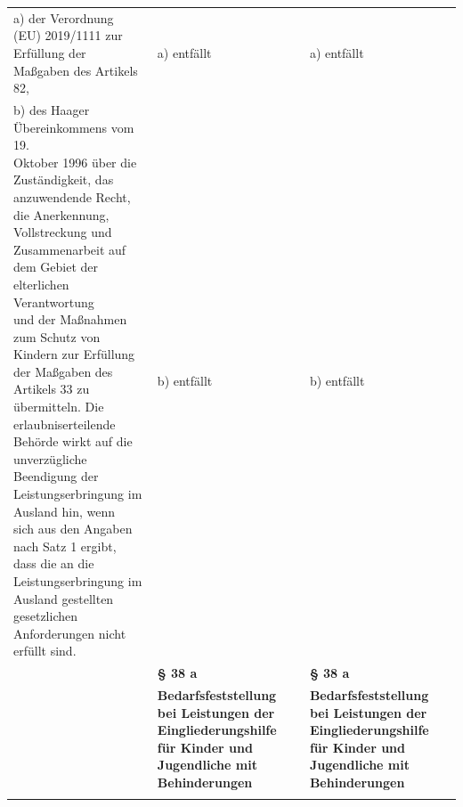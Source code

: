 \documentclass[10pt,a4paper,landscape]{article}
\begin{document}
\begin{longtable}{|L{8.2cm}|L{8.2cm}|L{8.2cm}|}
\hhline{|---|}
a)   \newline \textcolor{diffred}{der Verordnung (EU) 2019/1111 zur  \newline Erfüllung der Maßgaben des Artikels 82,} & a) entfällt & a) entfällt \\
\hhline{|---|}
b)   \newline \textcolor{diffred}{des Haager Übereinkommens vom 19.  \newline Oktober 1996 über die Zuständigkeit, das  \newline anzuwendende Recht, die Anerkennung,  \newline Vollstreckung und Zusammenarbeit auf  \newline dem Gebiet der elterlichen Verantwortung  \newline und der Maßnahmen zum Schutz von  \newline Kindern zur Erfüllung der Maßgaben des  \newline Artikels 33 zu übermitteln. Die  \newline erlaubniserteilende Behörde wirkt auf die  \newline unverzügliche Beendigung der  \newline Leistungserbringung im Ausland hin, wenn  \newline sich aus den Angaben nach Satz 1 ergibt,  \newline dass die an die Leistungserbringung im  \newline Ausland gestellten gesetzlichen  \newline Anforderungen nicht erfüllt sind.} & b) entfällt & b) entfällt \\
\hhline{|---|}
 & \textbf{\S{} 38 a} & \textbf{\S{} 38 a} \\
\hhline{|---|}
 & \textbf{Bedarfsfeststellung bei Leistungen der  \newline Eingliederungshilfe für Kinder und  \newline Jugendliche mit Behinderungen } & \textbf{Bedarfsfeststellung bei Leistungen der  \newline Eingliederungshilfe für Kinder und  \newline Jugendliche mit Behinderungen } \\
\hhline{|---|}

\end{longtable}
\end{document}
